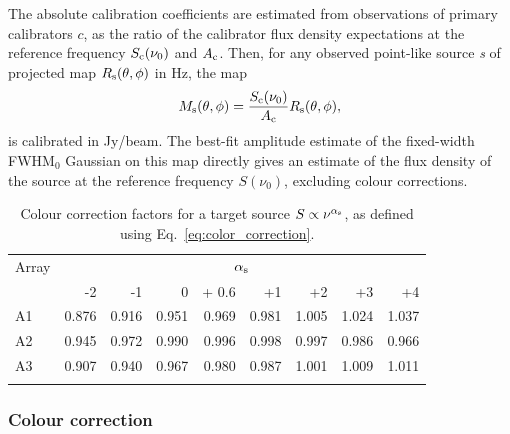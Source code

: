 The absolute calibration coefficients are estimated from observations
of primary calibrators $c$, as the ratio of
the calibrator flux density expectations at the reference frequency
$S_{\rm{c}}(\nu_0)$ and $A_{\rm{c}}$. Then, for any observed point-like source
{\sl s} of projected map $R_{\rm{s}}(\theta,\phi)$ in Hz, the map
\begin{equation}
  M_{\rm{s}}(\theta, \phi) = \frac{S_{\rm{c}} (\nu_{0})}{A_{\rm{c}}}
  R_{\rm{s}}(\theta,\phi),
  \label{eq:pointsourcephot}
\end{equation}
is calibrated in Jy/beam. {\lp The best-fit amplitude estimate
of the fixed-width FWHM$_{0}$ Gaussian on this map directly gives an
estimate of the flux density of the source at the reference
frequency $S(\nu_{0})$, excluding colour corrections.}

\begin{table}[!thbp]
\caption{Colour correction factors for a target source  $S \propto \nu^{\alpha_{\rm{s}}}$, as defined using Eq.~\ref{eq:color_correction}.}
\label{tab:mod}
\centering 
\begin{tabular}{lrrrrrrrr}
\hline\hline
\noalign{\smallskip}
Array     & \multicolumn{8}{c}{$\alpha_{\rm{s}}$} \\
\noalign{\smallskip}
\hline
\noalign{\smallskip}
         &  -2 &  -1    &    0  & + 0.6 & +1  &  +2  & +3 & +4  \\       
\noalign{\smallskip}
\hline
\noalign{\smallskip}
          A1   & 0.876  &  0.916   &   0.951  & 0.969 &  0.981   &  1.005  &    1.024  &  1.037   \\
          A2   & 0.945  &  0.972   &   0.990  & 0.996 &  0.998   &  0.997  &    0.986  &  0.966      \\ 
          A3   & 0.907  &  0.940   &   0.967  & 0.980 &  0.987   &  1.001  &    1.009  &  1.011     \\
            \noalign{\smallskip}
            \hline
\end{tabular}
\end{table}

\subsubsection{Colour correction}

